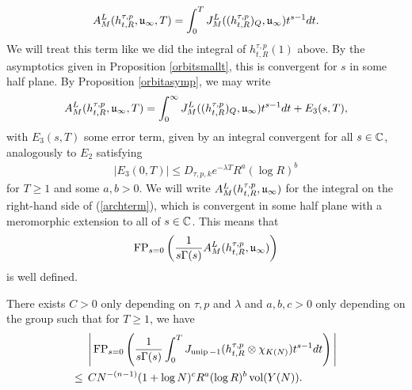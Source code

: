 \begin{align*}
    A_M^{L}(h^{\tau,p}_{t,R},\mathfrak{u}_\infty,T) = \int_0^T J^L_M((h^{\tau,p}_{t,R})_Q,\mathfrak{u}_\infty)t^{s-1}dt.
\end{align*}
We will treat this term like we did the integral of $h^{\tau,p}_{t,R}(1)$ above. By the asymptotics given in Proposition \ref{orbitsmallt}, this is convergent for $s$ in some half plane. By Proposition \ref{orbitasymp}, we may write
\begin{align}\label{archterm}
    A_M^{L}(h^{\tau,p}_{t,R},\mathfrak{u}_\infty,T) = \int_0^\infty J^L_M((h^{\tau,p}_{t,R})_Q,\mathfrak{u}_\infty)t^{s-1}dt+E_3(s,T),
\end{align}
with $E_3(s,T)$ some error term, given by an integral convergent for all $s\in\mathbb{C}$, analogously to $E_2$ satisfying
\begin{align}\label{error3}
    |E_3(0,T)|\leq D_{\tau,p,k} e^{-\lambda T} R^a(\log R)^b
\end{align}
for $T\geq 1$ and some $a,b>0$. We will write $A_M^{L}(h^{\tau,p}_{t,R},\mathfrak{u}_\infty)$ for the integral on the right-hand side of (\ref{archterm}), which is convergent in some half plane with a meromorphic extension to all of $s\in\mathbb{C}$. This means that
\begin{align*}
    \text{FP}_{s=0}\left(\frac{1}{s\Gamma(s)}A_M^{L}(h^{\tau,p}_{t,R},\mathfrak{u}_\infty)\right)
\end{align*}
is well defined. 
\begin{lem}\label{unip-1bound}
    There exists $C>0$ only depending on $\tau,p$ and $\lambda$ and $a,b,c>0$ only depending on the group such that for $T\geq 1$, we have
    \begin{align*}
    &\Bigg\vert\operatorname{FP}_{s=0}\left(\frac{1}{s\Gamma(s)}\int_0^T J_{\operatorname{unip}-1}(h^{\tau,p}_{t,R}\otimes\chi_{K(N)})t^{s-1}dt\right)\Bigg\vert \\
    \leq\:\: &C N^{-(n-1)}(1+\log N)^c R^a (\log R)^b\operatorname{vol}(Y(N)).
\end{align*}
\end{lem}

